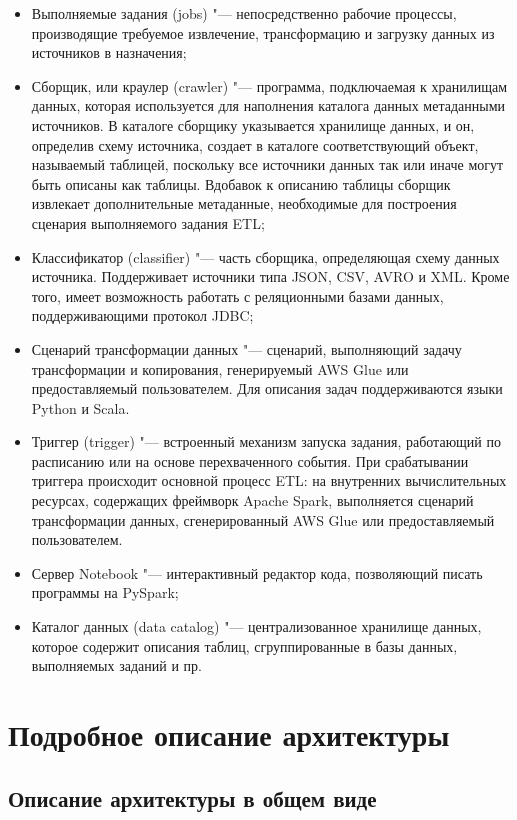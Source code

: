 \documentclass[bachelor, och, pract]{SCWorks}
\begin{document}
\begin{itemize}
	\item Выполняемые задания (jobs) "--- непосредственно рабочие процессы, производящие требуемое извлечение, трансформацию и загрузку данных из источников в назначения;
	\item Сборщик, или краулер (crawler) "--- программа, подключаемая к хранилищам данных, которая используется для наполнения каталога данных метаданными источников. В каталоге сборщику указывается хранилище данных, и он, определив схему источника, создает в каталоге соответствующий объект, называемый таблицей, поскольку все источники данных так или иначе могут быть описаны как таблицы. Вдобавок к описанию таблицы сборщик извлекает дополнительные метаданные, необходимые для построения сценария выполняемого задания ETL;
	\item Классификатор (classifier) "--- часть сборщика, определяющая схему данных источника. Поддерживает источники типа JSON, CSV, AVRO и XML. Кроме того, имеет возможность работать с реляционными базами данных, поддерживающими протокол JDBC;
	\item Сценарий трансформации данных "--- сценарий, выполняющий задачу трансформации и копирования, генерируемый AWS Glue или предоставляемый пользователем. Для описания задач поддерживаются языки Python и Scala.
	\item Триггер (trigger) "--- встроенный механизм запуска задания, работающий по расписанию или на основе перехваченного события. При срабатывании триггера происходит основной процесс ETL: на внутренних вычислительных ресурсах, содержащих фреймворк Apache Spark, выполняется сценарий трансформации данных, сгенерированный AWS Glue или предоставляемый пользователем.
	\item Сервер Notebook "--- интерактивный редактор кода, позволяющий писать программы на PySpark;
	\item Каталог данных (data catalog) "--- централизованное хранилище данных, которое содержит описания таблиц, сгруппированные в базы данных, выполняемых заданий и пр.
\end{itemize}


\newpage
\section{Подробное описание архитектуры}
\subsection{Описание архитектуры в общем виде}
\end{document}
